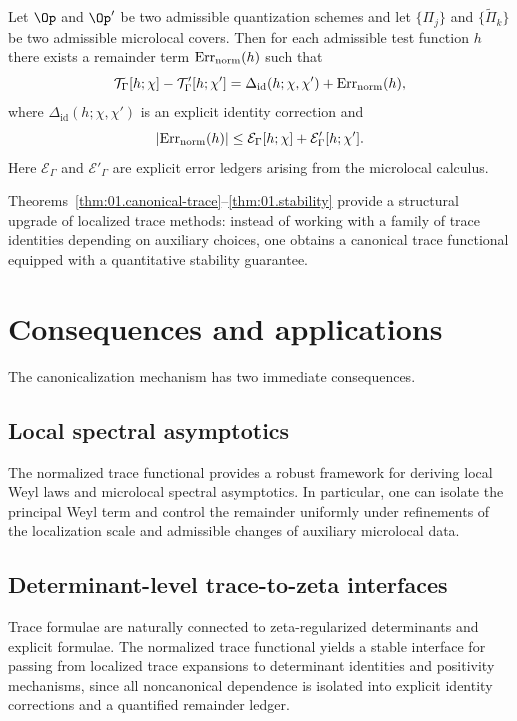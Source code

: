 \begin{theorem}
\label{thm:01.stability}
Let $\Op$ and $\Op'$ be two admissible quantization schemes and let $\{\Pi_j\}$ and $\{\widetilde{\Pi}_k\}$ be two
admissible microlocal covers.
Then for each admissible test function $h$ there exists a remainder term $\mathrm{Err}_{\mathrm{norm}}(h)$ such that
\[
\mathcal{T}_\Gamma[h;\chi]-\mathcal{T}'_\Gamma[h;\chi']
=
\Delta_{\mathrm{id}}(h;\chi,\chi')+\mathrm{Err}_{\mathrm{norm}}(h),
\]
where $\Delta_{\mathrm{id}}(h;\chi,\chi')$ is an explicit identity correction and
\[
|\mathrm{Err}_{\mathrm{norm}}(h)|
\le
\mathcal{E}_\Gamma[h;\chi]+\mathcal{E}'_\Gamma[h;\chi'].
\]
Here $\mathcal{E}_\Gamma$ and $\mathcal{E}'_\Gamma$ are explicit error ledgers arising from the microlocal calculus.
\end{theorem}

Theorems~\ref{thm:01.canonical-trace}--\ref{thm:01.stability} provide a structural upgrade of localized trace methods:
instead of working with a family of trace identities depending on auxiliary choices, one obtains a canonical trace
functional equipped with a quantitative stability guarantee.

\section{Consequences and applications}
\label{sec:01.applications}

The canonicalization mechanism has two immediate consequences.

\subsection{Local spectral asymptotics}
\label{subsec:01.applications.weyl}

The normalized trace functional provides a robust framework for deriving local Weyl laws and microlocal spectral
asymptotics.  In particular, one can isolate the principal Weyl term and control the remainder uniformly under
refinements of the localization scale and admissible changes of auxiliary microlocal data.

\subsection{Determinant-level trace-to-zeta interfaces}
\label{subsec:01.applications.zeta}

Trace formulae are naturally connected to zeta-regularized determinants and explicit formulae.
The normalized trace functional yields a stable interface for passing from localized trace expansions to
determinant identities and positivity mechanisms, since all noncanonical dependence is isolated into explicit
identity corrections and a quantified remainder ledger.

